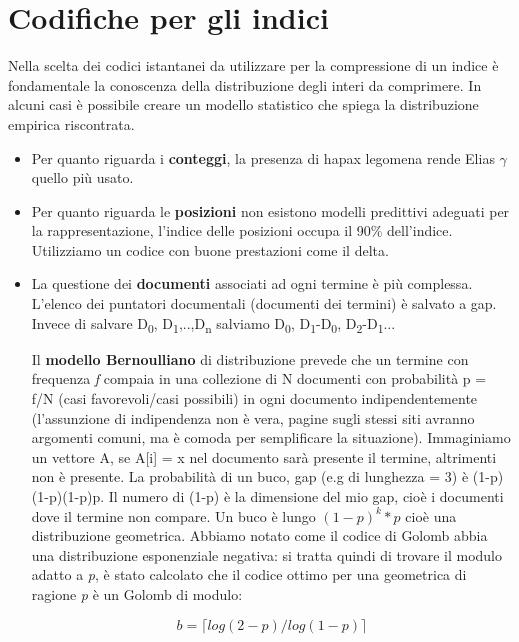\documentclass[12pt,italian]{report}
\begin{document}
\section{Codifiche per gli indici}
\label{Codifichepergliindici}
Nella scelta dei codici istantanei da utilizzare per la compressione di un indice è fondamentale la conoscenza della distribuzione degli interi da comprimere. In alcuni casi è possibile creare un modello statistico che spiega la distribuzione empirica riscontrata.

\begin{itemize}
    \item Per quanto riguarda i \textbf{conteggi}, la presenza di hapax legomena rende Elias $\gamma$ quello più usato.
            
    \item Per quanto riguarda le \textbf{posizioni} non esistono modelli predittivi adeguati per la rappresentazione, l'indice delle posizioni occupa il 90\% dell'indice. Utilizziamo un codice con buone prestazioni come il delta.
    
    \item La questione dei \textbf{documenti} associati ad ogni termine è più complessa. L'elenco dei puntatori documentali (documenti dei termini) è salvato a gap. Invece di salvare D\textsubscript{0}, D\textsubscript{1},..,D\textsubscript{n} salviamo D\textsubscript{0}, D\textsubscript{1}-D\textsubscript{0}, D\textsubscript{2}-D\textsubscript{1}...
    
    Il \textbf{modello Bernoulliano} di distribuzione prevede che un termine con frequenza \textit{f} compaia in una collezione di N documenti con probabilità p = f/N (casi favorevoli/casi possibili) in ogni documento indipendentemente (l'assunzione di indipendenza non è vera, pagine sugli stessi siti avranno argomenti comuni, ma è comoda per semplificare la situazione). Immaginiamo un vettore A, se A[i] = x nel documento sarà presente il termine, altrimenti non è presente. La probabilità di un buco, gap (e.g di lunghezza = 3) è (1-p)(1-p)(1-p)p. Il numero di (1-p) è la dimensione del mio gap, cioè i documenti dove il termine non compare. Un buco è lungo $(1-p)^k*p$ cioè una distribuzione geometrica.
    Abbiamo notato come il codice di Golomb abbia una distribuzione esponenziale negativa: si tratta quindi di trovare il modulo adatto a \textit{p}, è stato calcolato che il codice ottimo per una geometrica di ragione \textit{p} è un Golomb di modulo:

    \begin{equation}
        b = \lceil{log(2-p)/log(1-p)}\rceil
    \end{equation}

    
\end{itemize}
\end{document}
